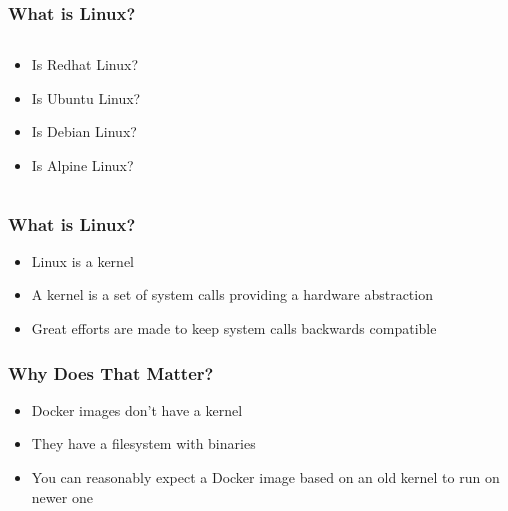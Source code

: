    \begin{frame}
    \frametitle{What is Linux?}
    \begin{columns}
        \begin{column}{0.5\textwidth}
            \begin{itemize}
                \item<2->Is Redhat Linux?
                \item<3->Is Ubuntu Linux?
                \item<4->Is Debian Linux?
                \item<5->Is Alpine Linux?
            \end{itemize}
        \end{column}
        \begin{column}{0.5\textwidth}
          \begin{center}
          \end{center}
        \end{column}
    \end{columns}
    \end{frame}

    \begin{frame}
    \frametitle{What is Linux?}
    \begin{itemize}
        \item<1-> Linux is a kernel
        \item<2-> A kernel is a set of system calls providing a hardware abstraction
        \item<3-> Great efforts are made to keep system calls backwards compatible
    \end{itemize}
    \end{frame}

    \begin{frame}
      \frametitle{Why Does That Matter?}
      \begin{itemize}
      \item<1-> Docker images don't have a kernel
      \item<2-> They have a filesystem with binaries
      \item<3-> You can reasonably expect a Docker image based on an old kernel to run on newer one
      \end{itemize}
    \end{frame}


